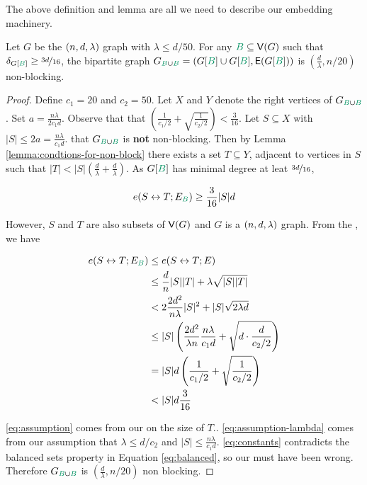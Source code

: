 \documentclass[11pt]{article}
\begin{document}
The above definition and lemma are all we need to describe our embedding machinery.

\begin{lemma}\label{lemma:bipartitie-is-non-blocking}Let $G$ be the $(n, d, \lambda)$ graph with $\lambda \leq d/50$. For any $\GreenB \subseteq \Vertices{G}$ such that $\MinimalDegree{G[\GreenB]} \geq \nicefrac{3d}{16}$,
 the bipartite graph  $\BipartiteG = (G[\GreenB] \cup G[\GreenB], \Edges{G[\GreenB]})$ is $(\frac{d}{\lambda},  n/20)$ non-blocking.
\end{lemma}

\begin{proof}
  Define $c_1 = 20$ and $c_2 = 50$. Let $X$ and $Y$ denote the right vertices of $\BipartiteG$.
  Set $a = \frac{n\lambda}{2c_1 d}$.
  Observe that that $\left(\frac{1}{c_1/2}  + \sqrt{\frac{1}{c_2/2}}\right) < \frac{3}{16}$.
Let $S \subseteq X$ with $|S| \leq 2a = \frac{n\lambda}{c_1 d}$.
 that $\BipartiteG$ is \textbf{not} non-blocking.
  Then by Lemma \ref{lemma:condtions-for-non-block} there exists a set $T \subseteq Y$, adjacent to vertices in $S$ such that $|T| < |S|(\frac{d}{\lambda}+\frac{d}{\lambda})$. 
As $G[\GreenB]$ has minimal degree at leat $\nicefrac{3d}{16}$, 

\begin{equation}\label{eq:balanced}
  \CutEdges{S}{T}{E_{\GreenB}} \geq \frac{3}{16}|S|d
\end{equation}

However, $S$ and $T$ are also subsets of $\mathsf{V}(G)$ and $G$ is a $(n, d, \lambda)$ graph.
From the , we have

\begin{align}
  \CutEdges{S}{T}{E_{\GreenB}} &\leq   \CutEdges{S}{T}{E} \\
  &\leq \frac{d}{n}|S||T| + \lambda\sqrt{|S||T|} \\
	&< 2\frac{2d^2}{n\lambda}|S|^2 + |S|\sqrt{2\lambda d} \label{eq:assumption}\\
	&\leq |S|\left(\frac{2d^2}{\lambda n} \frac{n\lambda}{c_1 d} + \sqrt{d\cdot \frac{d}{c_2/2}}\right) \label{eq:assumption-lambda}\\
	&= |S|d\left(\frac{1}{c_1/2}  + \sqrt{\frac{1}{c_2/2}}\right) \\
	&< |S|d\frac{3}{16} \label{eq:constants}
\end{align}

\eqref{eq:assumption} comes from our  on the size of $T$..
\eqref{eq:assumption-lambda} comes from our assumption that $\lambda \leq  d/c_2$ and $|S| \leq \frac{n\lambda}{c_1 d}$.
\eqref{eq:constants} contradicts the balanced sets property in Equation \eqref{eq:balanced}, so our  must have been wrong.
Therefore $\BipartiteG$ is $(\frac{d}{\lambda}, n/20)$ non blocking.
\end{proof}
\end{document}
